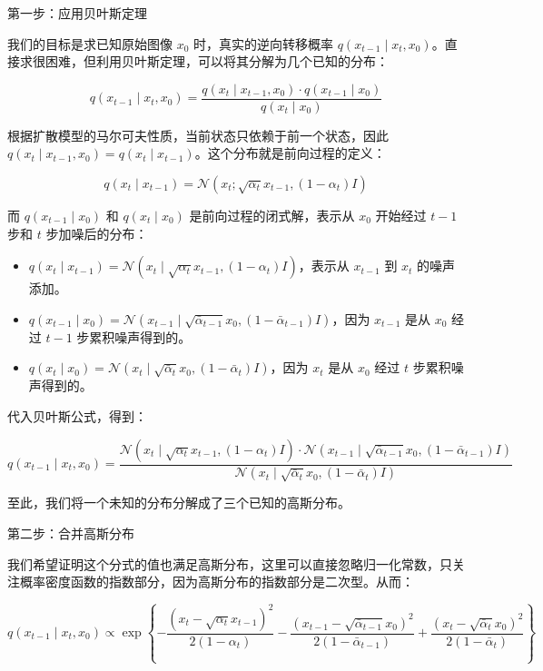第一步：应用贝叶斯定理

我们的目标是求已知原始图像 \(x_0\) 时，真实的逆向转移概率 \(q(x_{t-1}\mid x_t,x_0)\)。直接求很困难，但利用贝叶斯定理，可以将其分解为几个已知的分布：

\[
q(x_{t-1}\mid x_t,x_0)
= \frac{q(x_t\mid x_{t-1},x_0)\cdot q(x_{t-1}\mid x_0)}{q(x_t\mid x_0)}
\]

根据扩散模型的马尔可夫性质，当前状态只依赖于前一个状态，因此 \(q(x_t\mid x_{t-1},x_0)=q(x_t\mid x_{t-1})\)。这个分布就是前向过程的定义：

\[
q(x_t\mid x_{t-1})=\mathcal{N}(x_t;\sqrt{\alpha_t}x_{t-1},(1-\alpha_t)I)
\]

而 \(q(x_{t-1}\mid x_0)\) 和 \(q(x_t\mid x_0)\) 是前向过程的闭式解，表示从 \(x_0\) 开始经过 \(t-1\) 步和 \(t\) 步加噪后的分布：

\begin{itemize}
\tightlist
\item
  \(q(x_t\mid x_{t-1})=\mathcal{N}(x_t\mid\sqrt{\alpha_t}x_{t-1},(1-\alpha_t)I)\)，表示从 \(x_{t-1}\) 到 \(x_t\) 的噪声添加。
\item
  \(q(x_{t-1}\mid x_0)=\mathcal{N}(x_{t-1}\mid\sqrt{\bar{\alpha}_{t-1}}x_0,(1-\bar{\alpha}_{t-1})I)\)，因为 \(x_{t-1}\) 是从 \(x_0\) 经过 \(t-1\) 步累积噪声得到的。
\item
  \(q(x_t\mid x_0)=\mathcal{N}(x_t\mid\sqrt{\bar{\alpha}_t}x_0,(1-\bar{\alpha}_t)I)\)，因为 \(x_t\) 是从 \(x_0\) 经过 \(t\) 步累积噪声得到的。
\end{itemize}

代入贝叶斯公式，得到：

\[
q(x_{t-1}\mid x_t,x_0)
= \frac{
\mathcal{N}(x_t\mid\sqrt{\alpha_t}x_{t-1},(1-\alpha_t)I)\cdot
\mathcal{N}(x_{t-1}\mid\sqrt{\bar{\alpha}_{t-1}}x_0,(1-\bar{\alpha}_{t-1})I)
}{
\mathcal{N}(x_t\mid\sqrt{\bar{\alpha}_t}x_0,(1-\bar{\alpha}_t)I)
}
\]

至此，我们将一个未知的分布分解成了三个已知的高斯分布。

第二步：合并高斯分布

我们希望证明这个分式的值也满足高斯分布，这里可以直接忽略归一化常数，只关注概率密度函数的指数部分，因为高斯分布的指数部分是二次型。从而：

\[
q(x_{t-1}\mid x_t,x_0)
\propto
\exp\left\{
-\frac{(x_t-\sqrt{\alpha_t}x_{t-1})^2}{2(1-\alpha_t)}
-\frac{(x_{t-1}-\sqrt{\bar{\alpha}_{t-1}}x_0)^2}{2(1-\bar{\alpha}_{t-1})}
+\frac{(x_t-\sqrt{\bar{\alpha}_t}x_0)^2}{2(1-\bar{\alpha}_t)}
\right\}
\]

